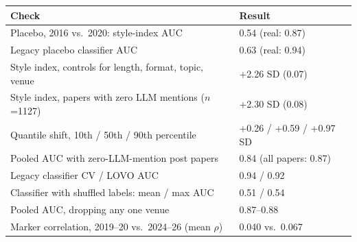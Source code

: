 \begin{tabular}{l l}
\toprule
Check & Result \\
\midrule
Placebo, 2016 vs.\ 2020: style-index AUC & 0.54 (real: 0.87) \\
Legacy placebo classifier AUC & 0.63 (real: 0.94) \\
Style index, controls for length, format, topic, venue & +2.26 SD (0.07) \\
Style index, papers with zero LLM mentions ($n$=1127) & +2.30 SD (0.08) \\
Quantile shift, 10th / 50th / 90th percentile & +0.26 / +0.59 / +0.97 SD \\
Pooled AUC with zero-LLM-mention post papers & 0.84 (all papers: 0.87) \\
Legacy classifier CV / LOVO AUC & 0.94 / 0.92 \\
Classifier with shuffled labels: mean / max AUC & 0.51 / 0.54 \\
Pooled AUC, dropping any one venue & 0.87--0.88 \\
Marker correlation, 2019--20 vs.\ 2024--26 (mean $\rho$) & 0.040 vs.\ 0.067 \\
\bottomrule
\end{tabular}
